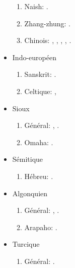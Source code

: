 \documentclass[oneside,a4paper,11pt]{article}
\newcommand{\langue}[2]{#2}
\begin{document}
\begin{itemize}
\begin{enumerate}
\item Naish: \citet{jacques.michaud11naish}.
\item  Zhang-zhung: \citet{jacques09zz}.
\item \langue{Chinese}{Chinois}:  \citet{jacques00ywij},  \citet{jacques03dissimilation}, \citet{jacques15sr},   \citet{jacques2015genetic}, \citet{jacques2015traditional}.
\end{enumerate}
\item \langue{Indo-European}{Indo-européen}
\begin{enumerate}
\item Sanskrit: \citet{jacques13vama}.
\item \langue{Celtic}{Celtique}: \citet{michaud-jacques12nasalite}, \citet{jacques15cochon}
\end{enumerate}
\item \langue{Siouan}{Sioux}
\begin{enumerate}
\item \langue{General}{Général}: \citet{jacques12bear},      \citet{michaud-jacques12nasalite}.  
\item Omaha: \citet{jacques16ebde}.
\end{enumerate}
\item \langue{Semitic}{Sémitique}
\begin{enumerate}
\item \langue{Hebrew}{Hébreu}: \citet{rg-gj12yod}.
\end{enumerate}
\item \langue{Algonquian}{Algonquien}
\begin{enumerate}
\item \langue{General}{Général}: \citet{jacques12bear}, \citet{jacques14inverse}.
\item Arapaho: \citet{jacques13arapaho}.
\end{enumerate}
\item  \langue{Turkic}{Turcique}
\begin{enumerate}
\item  \langue{General}{Général}: \citet{antonov12kumush}.
\end{enumerate}
\end{itemize} 
 
\end{document}
